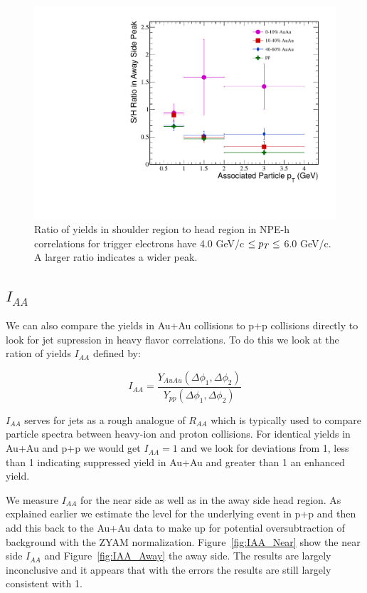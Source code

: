 \begin{figure}[htbp]
\begin{center}
\includegraphics[scale=.75]{Plots/Correlations/SH_Ratio.pdf}
\end{center}
\caption[Shoulder and Head Region Yield Comparison]{Ratio of yields in shoulder region to head region in NPE-h correlations for trigger electrons have 4.0 GeV/c $\leq p_{T} \leq$ 6.0 GeV/c. A larger ratio indicates a wider peak.}
\label{fig:SH_Ratio}
\end{figure}

\subsection{$I_{AA}$}

We can also compare the yields in Au+Au collisions to p+p collisions directly to look for jet supression in heavy flavor correlations. To do this we look at the ration of yields $I_{AA}$ defined by:

\begin{equation}\label{eq:IAA}
I_{AA} = \frac{Y_{AuAu}(\Delta\phi_1, \Delta\phi_2)}{Y_{pp}(\Delta\phi_1, \Delta\phi_2)}
\end{equation} 

$I_{AA}$ serves for jets as a rough analogue of $R_{AA}$ which is typically used to compare particle spectra between heavy-ion and proton collisions. For identical yields in Au+Au and p+p we would get $I_{AA} = 1$ and we look for deviations from 1, less than 1 indicating suppressed yield in Au+Au and greater than 1 an enhanced yield.

We measure $I_{AA}$ for the near side as well as in the away side head region. As explained earlier we estimate the level for the underlying event in p+p and then add this back to the Au+Au data to make up for potential oversubtraction of background with the ZYAM normalization. Figure~\ref{fig:IAA_Near} show the near side $I_{AA}$ and Figure~\ref{fig:IAA_Away} the away side. The results are largely inconclusive and it appears that with the errors the results are still largely consistent with 1.

